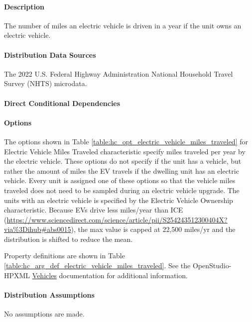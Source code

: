 \paragraph{Description}
% 
The number of miles an electric vehicle is driven in a year if the unit owns an electric vehicle.

\paragraph{Distribution Data Sources}
% 
The 2022 U.S. Federal Highway Administration National Household Travel Survey (NHTS) microdata.

\paragraph{Direct Conditional Dependencies}


\paragraph{Options}
The options shown in Table \ref{table:hc_opt_electric_vehicle_miles_traveled} for Electric Vehicle Miles Traveled characteristic specify miles traveled per year by the electric vehicle. These options do not specify if the unit has a vehicle, but rather the amount of miles the EV travels if the dwelling unit has an electric vehicle. Every unit is assigned one of these options so that the vehicle miles traveled does not need to be sampled during an electric vehicle upgrade. The units with an electric vehicle is specified by the Electric Vehicle Ownership characteristic. Because EVs drive less miles/year than ICE (\href{https://www.sciencedirect.com/science/article/pii/S254243512300404X?via%3Dihub#abs0015}{https://www.sciencedirect.com/science/article/pii/S254243512300404X?via\%3Dihub\#abs0015}), the max value is capped at 22,500 miles/yr and the distribution is shifted to reduce the mean.



Property definitions are shown in Table \ref{table:hc_arg_def_electric_vehicle_miles_traveled}. See the OpenStudio-HPXML \href{https://openstudio-hpxml.readthedocs.io/en/v1.10.0/workflow_inputs.html#hpxml-vehicles}{Vehicles} documentation for additional information.



\paragraph{Distribution Assumptions}
% 
No assumptions are made.
